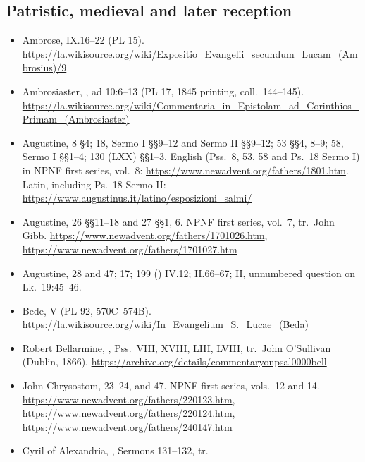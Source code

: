 \subsection*{Patristic, medieval and later reception}

\begin{itemize}[leftmargin=1.2em, itemsep=0.15em]
\item Ambrose,  IX.16--22 (PL 15).
\url{https://la.wikisource.org/wiki/Expositio_Evangelii_secundum_Lucam_(Ambrosius)/9}
\item Ambrosiaster, , ad
10:6--13 (PL 17, 1845 printing, coll.\ 144--145).
\url{https://la.wikisource.org/wiki/Commentaria_in_Epistolam_ad_Corinthios_Primam_(Ambrosiaster)}
\item Augustine,  8 §4; 18, Sermo I §§9--12 and
Sermo II §§9--12; 53 §§4, 8--9; 58, Sermo I §§1--4; 130 (LXX) §§1--3.
English (Pss.\ 8, 53, 58 and Ps.\ 18 Sermo I) in NPNF first series, vol.~8:
\url{https://www.newadvent.org/fathers/1801.htm}. Latin, including Ps.\ 18
Sermo II: \url{https://www.augustinus.it/latino/esposizioni_salmi/}
\item Augustine,  26 §§11--18 and 27
§§1, 6. NPNF first series, vol.~7, tr.\ John Gibb.
\url{https://www.newadvent.org/fathers/1701026.htm},
\url{https://www.newadvent.org/fathers/1701027.htm}
\item Augustine,  28 and 47;  17;  199 () IV.12;
 II.66--67; 
II, unnumbered question on Lk.\ 19:45--46.
\item Bede,  V (PL 92, 570C--574B).
\url{https://la.wikisource.org/wiki/In_Evangelium_S._Lucae_(Beda)}
\item Robert Bellarmine, , Pss.\ VIII, XVIII,
LIII, LVIII, tr.\ John O'Sullivan (Dublin, 1866).
\url{https://archive.org/details/commentaryonpsal0000bell}
\item John Chrysostom,  23--24, and
 47. NPNF first series, vols.\ 12 and 14.
\url{https://www.newadvent.org/fathers/220123.htm},
\url{https://www.newadvent.org/fathers/220124.htm},
\url{https://www.newadvent.org/fathers/240147.htm}
\item Cyril of Alexandria, , Sermons 131--132, tr.\

\end{itemize}
